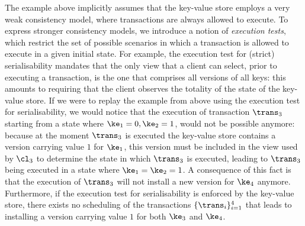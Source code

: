 The example above implicitly assumes that the key-value store employs a very weak consistency model, 
where transactions are always allowed to execute. To express stronger consistency models, 
we introduce a notion of \emph{execution tests}, which restrict the set of possible scenarios in which 
a transaction is allowed to execute in a given initial state. For example, the execution test for 
(strict) serialisability mandates that the only view that a client can select, prior to executing a transaction, 
is the one that comprises all versions of all keys: this amounts to requiring that the client observes the totality 
of the state of the key-value store. If we were to replay the example from above using the execution test 
for serialisability, we would notice that the execution of transaction $\trans_3$ starting from a state 
where $\ke_1 = 0, \ke_2 = 1$, would not be possible anymore: because at the moment $\trans_3$ is 
executed the key-value store contains a version carrying value $1$ for $\ke_1$, this version must be 
included in the view used by $\cl_3$ to determine the state in which $\trans_3$ is executed, leading 
to $\trans_3$ being executed in a state where $\ke_1 = \ke_2 = 1$. A consequence of this fact is 
that the execution of $\trans_3$ will not install a new version for $\ke_4$ anymore. Furthermore, 
if the execution test for serialisability is enforced by the key-value store, there exists no scheduling 
of the transactions $\{\trans_i\}_{i=1}^{4}$ that leads to installing a version carrying value 
$1$ for both $\ke_3$ and $\ke_4$.

